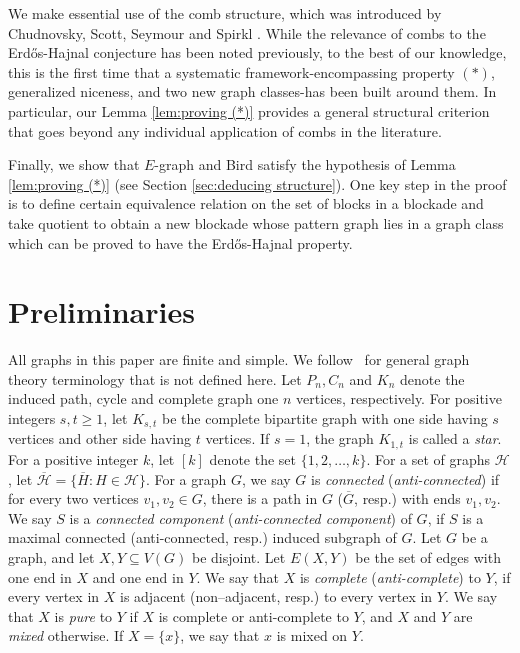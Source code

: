 \documentclass[a4paper,11pt]{article}
\begin{document}
    We make essential use of the comb structure, which was introduced by Chudnovsky, Scott, Seymour and Spirkl \cite{CSSS23}. While the relevance of combs to the Erdős-Hajnal conjecture has been noted previously, to the best of our knowledge, this is the first time that a systematic framework-encompassing property $(*)$, generalized niceness, and two new graph classes-has been built around them. In particular, our Lemma \ref{lem:proving (*)} provides a general structural criterion that goes beyond any individual application of combs in the literature.
    
    Finally, we show that $E$-graph and Bird satisfy the hypothesis of Lemma \ref{lem:proving (*)}
    (see Section \ref{sec:deducing structure}).  
    One key step in the proof is to define certain equivalence relation on the set of blocks in a blockade and take quotient to obtain a new blockade whose pattern graph lies in a graph class which can be proved to have the Erd\H{o}s-Hajnal property. 

\section{Preliminaries}\label{sec:pre}

All graphs in this paper are finite and simple. We follow~\cite{BM08} for general graph theory terminology that is not defined here. Let $P_n,C_n$ and $K_n$ denote the induced path, cycle and complete graph one $n$ vertices, respectively.
For positive integers $s,t\ge 1$, let $K_{s,t}$ be the complete bipartite graph with one side having $s$ vertices and other side having $t$ vertices. 
If $s=1$, the graph $K_{1,t}$ is called a {\em star}. 
For a positive integer $k$, let $[k]$ denote the set $\{1,2,\ldots,k\}$. 
For a set of graphs $\mathcal{H}$, let $\overline{\mathcal{H}}=\{\overline{H}:H\in \mathcal{H}\}$. 
For a graph $G$, we say $G$ is {\em connected} ({\em anti-connected}) if for every two vertices $v_1,v_2\in G$, there is a path in $G$ ($\overline{G}$, resp.) with ends $v_1,v_2$. 
We say $S$ is a {\em connected component} ({\em anti-connected component}) of $G$, if $S$ is a maximal connected (anti-connected, resp.) induced subgraph of $G$. 
Let $G$ be a graph, and let $X,Y\subseteq V(G)$ be disjoint. 
Let $E(X,Y)$ be the set of edges with one end in $X$ and one end in $Y$. 
We say that $X$ is {\em complete} ({\em anti-complete}) to $Y$, if every vertex in $X$ is adjacent (non--adjacent, resp.) to every vertex in $Y$. 
We say that $X$ is {\em pure} to $Y$ if $X$ is complete or anti-complete to $Y$, and $X$ and $Y$ are {\em mixed} otherwise. If $X=\{x\}$, we say that $x$ is mixed on $Y$.
\end{document}
